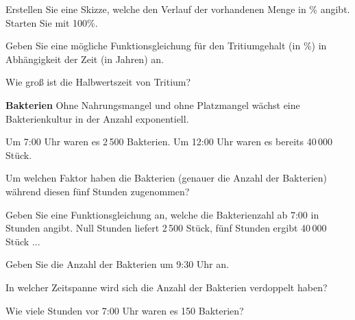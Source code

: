 \begin{bbwAufgabenBlock}
\item Erstellen Sie eine Skizze, welche den Verlauf der vorhandenen
  Menge in \% angibt. Starten Sie mit 100\%.


\item Geben Sie eine mögliche Funktionsgleichung für den Tritiumgehalt
  (in \%)
  in Abhängigkeit der Zeit (in Jahren) an.

  
\item  
  Wie groß ist die Halbwertszeit von Tritium?

\end{bbwAufgabenBlock}
\platzFuerBerechnungenBisEndeSeite{}


\bbwActAufgabenNr{} \textbf{Bakterien}
 Ohne Nahrungsmangel und ohne Platzmangel wächst eine Bakterienkultur
 in der Anzahl exponentiell.

Um 7:00 Uhr waren es 2\,500 Bakterien.
Um 12:00 Uhr waren es bereits 40\,000 Stück.

\begin{bbwAufgabenBlock}

\item Um welchen Faktor haben die Bakterien (genauer die Anzahl der Bakterien) während diesen fünf
Stunden zugenommen?


\item Geben Sie eine Funktionsgleichung an, welche die Bakterienzahl ab
7:00 in Stunden angibt. Null Stunden liefert 2\,500 Stück, fünf
      Stunden ergibt 40\,000 Stück ...

\item Geben Sie die Anzahl der Bakterien um 9:30 Uhr an.

\item In welcher Zeitspanne wird sich die Anzahl der Bakterien
verdoppelt haben?

\item Wie viele Stunden vor 7:00 Uhr waren es 150 Bakterien?


\end{bbwAufgabenBlock}
\platzFuerBerechnungenBisEndeSeite{}


